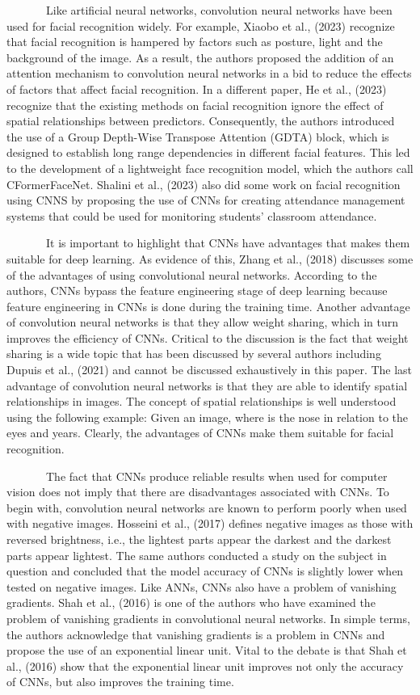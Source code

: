 \documentclass[
  12pt,
]{article}
\begin{document}
~~~~~~~Like artificial neural networks, convolution neural networks have
been used for facial recognition widely. For example, Xiaobo et al.,
(2023) recognize that facial recognition is hampered by factors such as
posture, light and the background of the image. As a result, the authors
proposed the addition of an attention mechanism to convolution neural
networks in a bid to reduce the effects of factors that affect facial
recognition. In a different paper, He et al., (2023) recognize that the
existing methods on facial recognition ignore the effect of spatial
relationships between predictors. Consequently, the authors introduced
the use of a Group Depth-Wise Transpose Attention (GDTA) block, which is
designed to establish long range dependencies in different facial
features. This led to the development of a lightweight face recognition
model, which the authors call CFormerFaceNet. Shalini et al., (2023)
also did some work on facial recognition using CNNS by proposing the use
of CNNs for creating attendance management systems that could be used
for monitoring students' classroom attendance.

~~~~~~~It is important to highlight that CNNs have advantages that makes
them suitable for deep learning. As evidence of this, Zhang et al.,
(2018) discusses some of the advantages of using convolutional neural
networks. According to the authors, CNNs bypass the feature engineering
stage of deep learning because feature engineering in CNNs is done
during the training time. Another advantage of convolution neural
networks is that they allow weight sharing, which in turn improves the
efficiency of CNNs. Critical to the discussion is the fact that weight
sharing is a wide topic that has been discussed by several authors
including Dupuis et al., (2021) and cannot be discussed exhaustively in
this paper. The last advantage of convolution neural networks is that
they are able to identify spatial relationships in images. The concept
of spatial relationships is well understood using the following example:
Given an image, where is the nose in relation to the eyes and years.
Clearly, the advantages of CNNs make them suitable for facial
recognition.

~~~~~~~The fact that CNNs produce reliable results when used for
computer vision does not imply that there are disadvantages associated
with CNNs. To begin with, convolution neural networks are known to
perform poorly when used with negative images. Hosseini et al., (2017)
defines negative images as those with reversed brightness, i.e., the
lightest parts appear the darkest and the darkest parts appear lightest.
The same authors conducted a study on the subject in question and
concluded that the model accuracy of CNNs is slightly lower when tested
on negative images. Like ANNs, CNNs also have a problem of vanishing
gradients. Shah et al., (2016) is one of the authors who have examined
the problem of vanishing gradients in convolutional neural networks. In
simple terms, the authors acknowledge that vanishing gradients is a
problem in CNNs and propose the use of an exponential linear unit. Vital
to the debate is that Shah et al., (2016) show that the exponential
linear unit improves not only the accuracy of CNNs, but also improves
the training time.
\end{document}
